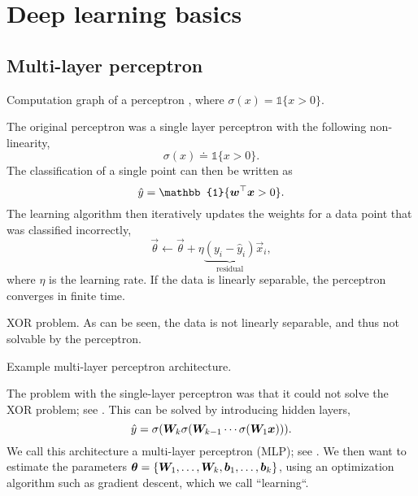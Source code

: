 \section{Deep learning basics}

\subsection{Multi-layer perceptron}

\begin{marginfigure}
    \centering
    \caption{Computation graph of a perceptron \citep{rosenblatt1958perceptron}, where $\sigma(x) = \mathbb{1}\{ x > 0 \}$.}
    \label{fig:perceptron}
\end{marginfigure}

The original perceptron \citep{rosenblatt1958perceptron} was a single layer perceptron with the
following non-linearity, \[
    \sigma(x) \doteq \mathbb{1}\{ x > 0 \}.
\]
The classification of a single point can then be written as \[
    \hat{y} = \mathbb{1}\{\transpose{\vec{w}}\vec{x} > 0\}.
\]
The learning algorithm then iteratively updates the weights for a data point that was classified
incorrectly, \[
    \vec{\theta} \gets \vec{\theta} + \eta \underbrace{(y_i - \hat{y}_i)}_{\text{residual}} \vec{x}_i,
\]
where $\eta$ is the learning rate. If the data is linearly separable, the perceptron converges in
finite time.

\begin{marginfigure}
    \centering
    \caption{XOR problem. As can be seen, the data is not linearly separable, and thus not solvable by the perceptron.}
    \label{fig:xor-problem}
\end{marginfigure}

\begin{marginfigure}
    \centering
    \caption{Example multi-layer perceptron architecture.}
    \label{fig:mlp}
\end{marginfigure}

The problem with the single-layer perceptron was that it could not solve the XOR problem; see
. This can be solved by introducing hidden layers, \[
    \hat{y} = \sigma(\bm{W}_k \sigma(\bm{W}_{k-1} \cdots \sigma(\bm{W}_1 \bm{x}))).
\]
We call this architecture a multi-layer perceptron (MLP); see . We then want to estimate
the parameters $\bm{\theta} = \{ \bm{W}_1,\ldots,\bm{W}_k,\bm{b}_1,\ldots,\bm{b}_k \}$, using
an optimization algorithm such as gradient descent, which we call ``learning``.

